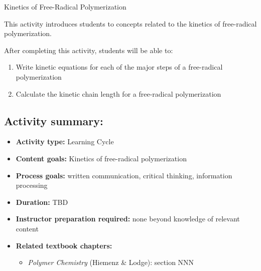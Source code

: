 %
%
%
%

\renewcommand{\figpath}{content}
\renewcommand{\labelbase}{FRPkinetics}

\begin{activity}{Kinetics of Free-Radical Polymerization}

\begin{instructornotes}
	This activity introduces students to concepts related to the kinetics of free-radical polymerization.
	
	After completing this activity, students will be able to:
	\begin{enumerate}
		\item Write kinetic equations for each of the major steps of a free-radical polymerization
		\item Calculate the kinetic chain length for a free-radical polymerization
	\end{enumerate}
	
	\subsection*{Activity summary:}
	\begin{itemize}
		\item \textbf{Activity type:} Learning Cycle
		\item \textbf{Content goals:} Kinetics of free-radical polymerization
		\item \textbf{Process goals:} %
			written communication, critical thinking, information processing
		\item \textbf{Duration:} TBD
		\item \textbf{Instructor preparation required:} none beyond knowledge of relevant content
		\item \textbf{Related textbook chapters:}
			\begin{itemize}
				\item \emph{Polymer Chemistry} (Hiemenz \& Lodge): section NNN
			\end{itemize}
	\end{itemize}
	

\end{instructornotes}
\end{activity}
